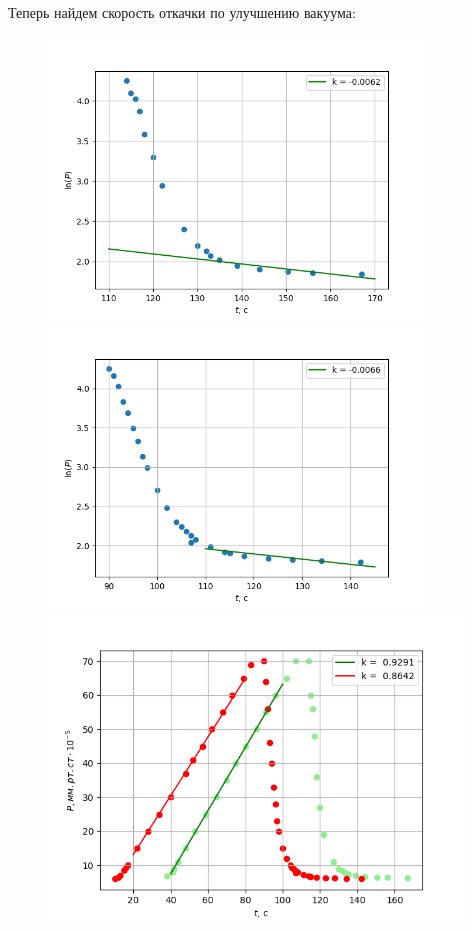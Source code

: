 Теперь найдем скорость откачки по улучшению вакуума:
\begin{figure}[h!]
    \begin{minipage}{0.5\textwidth}
        \includegraphics[width=10cm]{plotBetter1.png}
    \end{minipage}
    \begin{minipage}{0.5\textwidth}
        \includegraphics[width=10cm]{plotBetter2.png}
    \end{minipage}

    \begin{minipage}{0.99\textwidth}
        \centering
        \includegraphics[width=11cm]{ALLPLOT.png}
    \end{minipage}
\end{figure}
%
